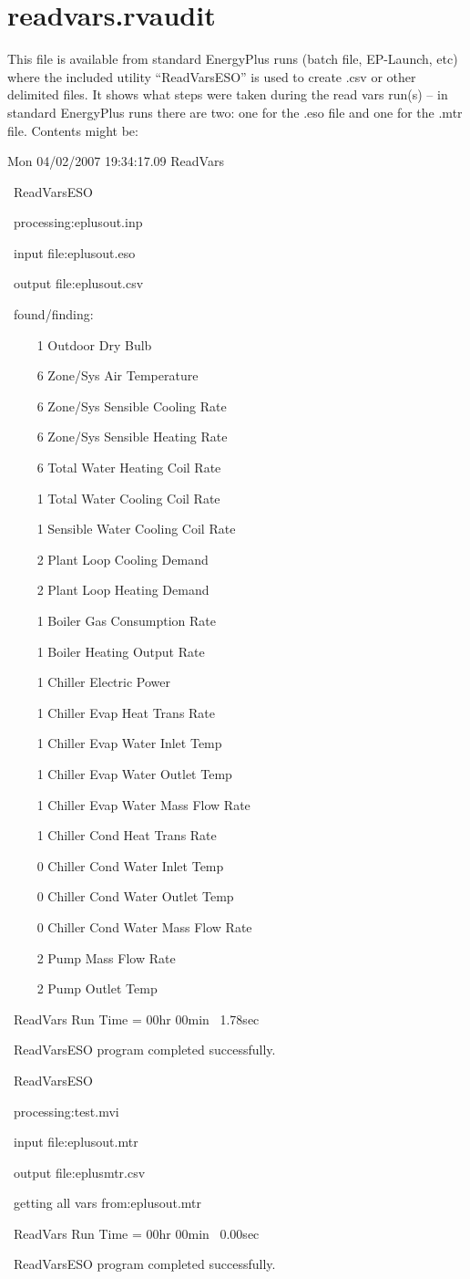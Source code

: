 \section{readvars.rvaudit}\label{readvars.rvaudit}

This file is available from standard EnergyPlus runs (batch file, EP-Launch, etc) where the included utility ``ReadVarsESO'' is used to create .csv or other delimited files. It shows what steps were taken during the read vars run(s) -- in standard EnergyPlus runs there are two: one for the .eso file and one for the .mtr file. Contents might be:

Mon 04/02/2007 19:34:17.09 ReadVars

~ReadVarsESO

~processing:eplusout.inp

~input file:eplusout.eso

~output file:eplusout.csv

~found/finding:

~~~~ 1 Outdoor Dry Bulb

~~~~ 6 Zone/Sys Air Temperature

~~~~ 6 Zone/Sys Sensible Cooling Rate

~~~~ 6 Zone/Sys Sensible Heating Rate

~~~~ 6 Total Water Heating Coil Rate

~~~~ 1 Total Water Cooling Coil Rate

~~~~ 1 Sensible Water Cooling Coil Rate

~~~~ 2 Plant Loop Cooling Demand

~~~~ 2 Plant Loop Heating Demand

~~~~ 1 Boiler Gas Consumption Rate

~~~~ 1 Boiler Heating Output Rate

~~~~ 1 Chiller Electric Power

~~~~ 1 Chiller Evap Heat Trans Rate

~~~~ 1 Chiller Evap Water Inlet Temp

~~~~ 1 Chiller Evap Water Outlet Temp

~~~~ 1 Chiller Evap Water Mass Flow Rate

~~~~ 1 Chiller Cond Heat Trans Rate

~~~~ 0 Chiller Cond Water Inlet Temp

~~~~ 0 Chiller Cond Water Outlet Temp

~~~~ 0 Chiller Cond Water Mass Flow Rate

~~~~ 2 Pump Mass Flow Rate

~~~~ 2 Pump Outlet Temp

~ReadVars Run Time = 00hr 00min~ 1.78sec

~ReadVarsESO program completed successfully.

~ReadVarsESO

~processing:test.mvi

~input file:eplusout.mtr

~output file:eplusmtr.csv

~getting all vars from:eplusout.mtr

~ReadVars Run Time = 00hr 00min~ 0.00sec

~ReadVarsESO program completed successfully.
